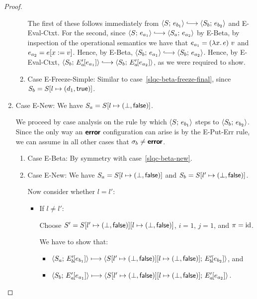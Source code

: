 \begin{proof}
\begin{enumerate}
\begin{enumerate}
      The first of these follows immediately from $\config{S}{e_{b_1}}
      \parstepsto \config{S_b}{e_{b_2}}$ and {\sc E-Eval-Ctxt}.  For
      the second, since $\config{S}{e_{a_1}} \parstepsto
      \config{S_a}{e_{a_2}}$ by {\sc E-Beta}, by inspection of the
      operational semantics we have that $e_{a_1} =
      (\lambda x.\,e)~v$ and $e_{a_2} = e[x := v]$.  Hence,
      by {\sc E-Beta}, $\config{S_b}{e_{a_1}} \parstepsto
      \config{S_b}{e_{a_2}}$.  Hence, by {\sc E-Eval-Ctxt},
      $\config{S_b}{\evalctxt{E'_a}{e_{a_1}}} \parstepsto
      \config{S_b}{\evalctxt{E'_a}{e_{a_2}}}$, as we were required to
      show.


    \item \label{slqc-beta-freeze-simple}Case {\sc E-Freeze-Simple}:
      Similar to case~\ref{slqc-beta-freeze-final}, since $S_b =
      S[l \mapsto (d_1, \textsf{true})]$.

    \end{enumerate}
  \item Case {\sc E-New}: We have $S_a = S[l \mapsto (\bot, \textsf{false})]$.

    We proceed by case analysis on the rule by which
    $\langle S;\, e_{b_1} \rangle$ steps to $\langle S_b;\, e_{b_2} \rangle$.  Since the
    only way an $\textbf{\textsf{error}}$ configuration can arise is by the {\sc
      E-Put-Err} rule, we can assume in all other cases that $\sigma_b
    \neq \textbf{\textsf{error}}$.
    \begin{enumerate}
    \item \label{slqc-new-beta}Case {\sc E-Beta}: By symmetry with case~\ref{slqc-beta-new}.
    \item \label{slqc-new-new}Case {\sc E-New}: We have $S_a =
      S[l \mapsto (\bot, \textsf{false})]$ and $S_b =
      S[l' \mapsto (\bot, \textsf{false})]$.

      Now consider whether $l = l'$:
      \begin{itemize}
        \item If $l \neq l'$:

          Choose $S' =
          S[l' \mapsto (\bot, \textsf{false})][l \mapsto (\bot, \textsf{false})]$,
          $i = 1$, $j = 1$, and $\pi = \mathrm{id}$.

          We have to show that:
          \begin{itemize}
          \item
            $\langle S_a;\, E'_b\hspace{-1mm}\left[e_{b_1}\right] \rangle \longmapsto
            \langle S[l' \mapsto (\bot, \textsf{false})][l \mapsto (\bot, \textsf{false})];\, E'_b\hspace{-1mm}\left[e_{b_2}\right] \rangle$,
            and
          \item
            $\langle S_b;\, E'_a\hspace{-1mm}\left[e_{a_1}\right] \rangle \longmapsto
            \langle S[l' \mapsto (\bot, \textsf{false})][l \mapsto (\bot, \textsf{false})];\, E'_a\hspace{-1mm}\left[e_{a_2}\right] \rangle$.
          \end{itemize}


\end{itemize}
\end{enumerate}
\end{enumerate}
\end{proof}
